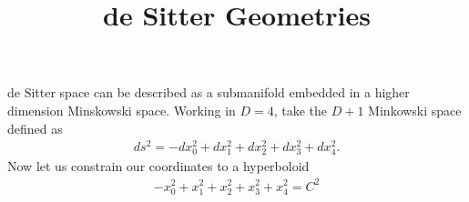 \documentclass[10pt,letterpaper]{article}
\title{de Sitter Geometries}
\date{}
\begin{document}
 
	\maketitle
	\noindent 
de Sitter space can be described as a submanifold embedded in a higher dimension Minskowski space. Working in $D=4$, take the $D+1$ Minkowski space defined as
\begin{eqnarray}
ds^2 = -dx_0^2 + dx_1^2 + dx_2^2 + dx_3^2 + dx_4^2.
\end{eqnarray}
Now let us constrain our coordinates to a hyperboloid
\begin{eqnarray}
-x_0^2 + x_1^2 + x_2^2 + x_3^2 + x_4^2 = C^2
\end{eqnarray}
\end{document}

